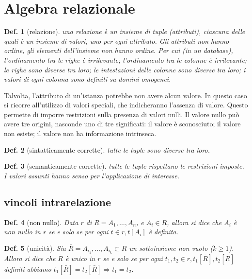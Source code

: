 \documentclass{article}
\newtheorem{definition}{Def.}[section]
\begin{document}
\section{Algebra relazionale}
\begin{definition}[relazione]
	una relazione è un insieme di tuple (attributi), ciascuna delle quali è un 
	insieme di valori, uno per ogni attributo. Gli attributi non hanno ordine, 
	gli elementi dell'insieme non hanno ordine. Per cui (in un database), 
	l'ordinamento tra le righe è irrilevante; l'ordinamento tra le colonne è 
	irrilevante; le righe sono diverse tra loro; le intestazioni delle colonne 
	sono diverse tra loro; i valori di ogni colonna sono definiti su domini 
	omogenei.
\end{definition}

Talvolta, l'attributo di un'istanza potrebbe non avere alcun valore. In questo
caso si ricorre all'utilizzo di valori speciali, che indicheranno l'assenza di
valore. Questo permette di imporre restrizioni sulla presenza di valori nulli.
Il valore nullo può avere tre origini, nasconde uno di tre significati: il
valore è sconosciuto; il valore non esiste; il valore non ha informazione
intrinseca.

\begin{definition}[sintatticamente corrette]
	tutte le tuple sono diverse tra loro.
\end{definition}

\begin{definition}[semanticamente corrette]
	tutte le tuple rispettano le restrizioni imposte. I valori assunti hanno
	senso per l'applicazione di interesse.
\end{definition}

\subsection{vincoli intrarelazione}
\begin{definition}[non nullo]
	Data $r$ di $R=A_1, \dots, A_n$, e $A_i \in R$, allora si dice che $A_i$ è
	non nullo in $r$ se e solo se per ogni $t \in r, t[A_i]$ è definita.
\end{definition}

\begin{definition}[unicità]
	Sia $\bar{R} = A_{i_1}, \dots, A_{i_k} \subset R$ un sottoinsieme non vuoto 
	($k \geq 1$). Allora si dice che $\bar{R}$ è unico in $r$ se e solo se per
	ogni $t_1, t_2 \in r, t_1[\bar{R}], t_2[\bar{R}]$ definiti abbiamo 
	$t_1[\bar{R}] = t_2[\bar{R}] \Rightarrow t_1 = t_2$.
\end{definition}
\end{document}

